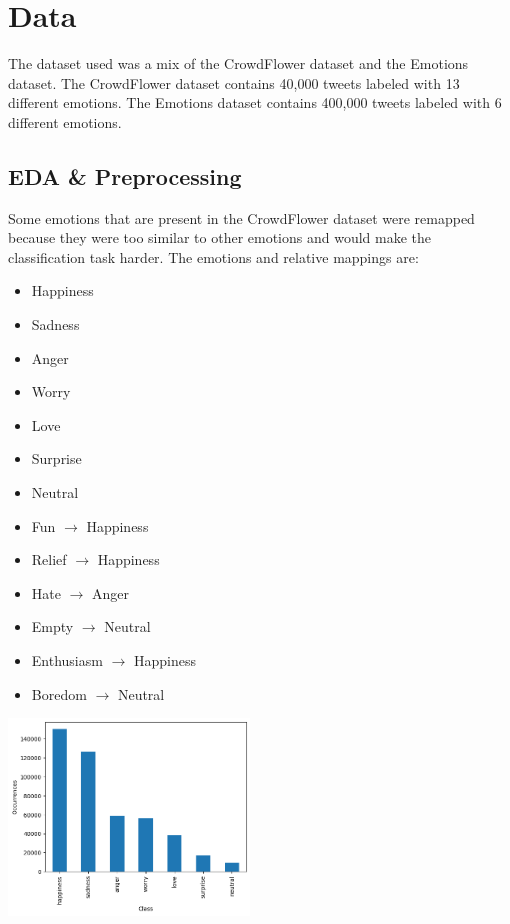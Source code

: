 \section{Data}
The dataset used was a mix of the CrowdFlower 
dataset\cite{crowdflower_dataset} and the
Emotions dataset\cite{emotions_dataset}.
The CrowdFlower dataset contains 40,000 tweets
labeled with 13 different emotions. The Emotions 
dataset contains 400,000 tweets labeled with 6 
different emotions.

\subsection{EDA \& Preprocessing}
Some emotions that are present in the
CrowdFlower dataset were remapped because they
were too similar to other emotions and 
would make the classification task harder.
The emotions and relative mappings are:
\begin{itemize}
    \item Happiness
    \item Sadness
    \item Anger
    \item Worry
    \item Love
    \item Surprise
    \item Neutral
    \item Fun $\rightarrow$ Happiness
    \item Relief $\rightarrow$ Happiness
    \item Hate $\rightarrow$ Anger
    \item Empty $\rightarrow$ Neutral
    \item Enthusiasm $\rightarrow$ Happiness
    \item Boredom $\rightarrow$ Neutral
\end{itemize}

\begingroup
    \centering
    \includegraphics[width=0.48\textwidth]{assets/class_distribution.png}
    \label{fig:class_distribution}
\endgroup

